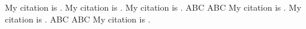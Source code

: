 \documentclass[english]{article}
\begin{document}
My citation is \cite{opinionmarbvmad}.\newpage
My citation is \cite{opinionmarbvmad}.\newpage
My citation is \cite{opinionmarbvmad}.\newpage
ABC
\newpage
ABC
\newpage
My citation is \cite{opinionmarbvmad}.\newpage
My citation is \cite{opinionmarbvmad}.\newpage
ABC
\newpage
ABC
\newpage
My citation is \cite{opinionmarbvmad}.\newpage

\printbibliography[title={Table of Cases}]
\end{document}
